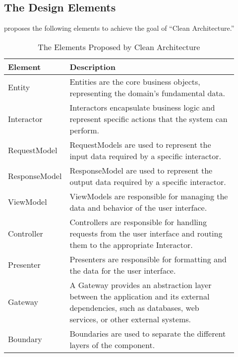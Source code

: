 \subsection{The Design Elements} \label{subsec_design_elements}

\textcite{robert_c_martin_clean_2018} proposes the following elements to achieve
the goal of \enquote{Clean Architecture.}

\begin{table}[H]
    \begin{tabular}{ p{0.18\linewidth} p{0.74\linewidth}}
        \hline
        \textbf{Element} & \textbf{Description} \\ 
        \hline
        Entity & Entities are the core business objects, representing the domain's
        fundamental data.\\ \midrule

        Interactor & Interactors encapsulate business logic and represent specific actions
        that the system can perform. \\ \midrule

        RequestModel & RequestModels are used to represent the input data required by a specific
        interactor.\\ \midrule

        ResponseModel & ResponseModel are used to represent the output data required by a
        specific interactor.\\ \midrule

        ViewModel & ViewModels are responsible for managing the data and behavior of the
        user interface. \\ \midrule

        Controller & Controllers are responsible for handling requests from the user
        interface and routing them to the appropriate Interactor.\\ \midrule

        Presenter & Presenters are responsible for formatting and the data for the user
        interface.\\ \midrule

        Gateway & A Gateway provides an abstraction layer between the application and its
        external dependencies, such as databases, web services, or other external
        systems.\\ \midrule

        Boundary & Boundaries are used to separate the different layers of the component.\\

        \bottomrule
    \end{tabular}
    \caption{The Elements Proposed by Clean Architecture}
    \label{ca_element}
\end{table}